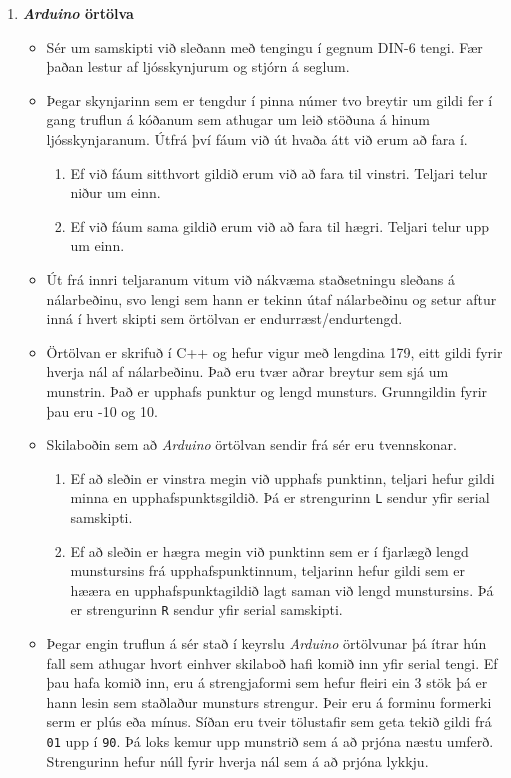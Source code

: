 \begin{enumerate}
    \item \textbf{\textit{Arduino} örtölva} \begin{itemize}
        \item Sér um samskipti við sleðann með tengingu í gegnum DIN-6 tengi. Fær þaðan lestur af ljósskynjurum og stjórn á seglum. 
        \item Þegar skynjarinn sem er tengdur í pinna númer tvo breytir um gildi fer í gang truflun á kóðanum sem athugar um leið stöðuna á hinum ljósskynjaranum. Útfrá því fáum við út hvaða átt við erum að fara í. \begin{enumerate}
            \item Ef við fáum sitthvort gildið erum við að fara til vinstri. Teljari telur niður um einn.
            \item Ef við fáum sama gildið erum við að fara til hægri. Teljari telur upp um einn.
        \end{enumerate}
        \item Út frá innri teljaranum vitum við nákvæma staðsetningu sleðans á nálarbeðinu, svo lengi sem hann er tekinn útaf nálarbeðinu og setur aftur inná í hvert skipti sem örtölvan er endurræst/endurtengd.
        \item Örtölvan er skrifuð í C++ og hefur vigur með lengdina 179, eitt gildi fyrir hverja nál af nálarbeðinu. Það eru tvær aðrar breytur sem sjá um munstrin. Það er upphafs punktur og lengd munsturs. Grunngildin fyrir þau eru -10 og 10.
        \item Skilaboðin sem að \textit{Arduino} örtölvan sendir frá sér eru tvennskonar.
        \begin{enumerate}
            \item Ef að sleðin er vinstra megin við upphafs punktinn, teljari hefur gildi minna en upphafspunktsgildið. Þá er strengurinn \texttt{L} sendur yfir serial samskipti. 
            \item Ef að sleðin er hægra megin við punktinn sem er í fjarlægð lengd munstursins frá upphafspunktinnum, teljarinn hefur gildi sem er hææra en upphafspunktagildið lagt saman við lengd munstursins. Þá er strengurinn \texttt{R} sendur yfir serial samskipti.
        \end{enumerate}
        \item Þegar engin truflun á sér stað í keyrslu \textit{Arduino} örtölvunar þá ítrar hún fall sem athugar hvort einhver skilaboð hafi komið inn yfir serial tengi. Ef þau hafa komið inn, eru á strengjaformi sem hefur fleiri ein 3 stök þá er hann lesin sem staðlaður munsturs strengur. Þeir eru á forminu formerki serm er plús eða mínus. Síðan eru tveir tölustafir sem geta tekið gildi frá \texttt{01} upp í \texttt{90}. Þá loks kemur upp munstrið sem á að prjóna næstu umferð. Strengurinn hefur núll fyrir hverja nál sem á að prjóna lykkju.

\end{itemize}
\end{enumerate}
